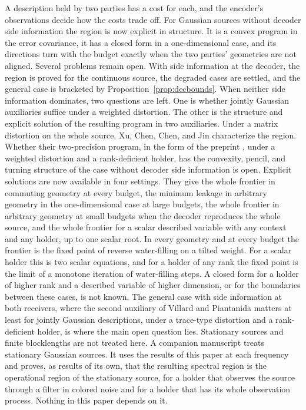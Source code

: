 \documentclass[11pt,onecolumn]{IEEEtran}
\begin{document}
A description held by two parties has a cost for each, and the
encoder's observations decide how the costs trade off. For Gaussian
sources without decoder side information the region is now explicit in
structure. It is a convex program in the error covariance, it has a closed form in a
one-dimensional case, and its directions turn with the budget exactly
when the two parties' geometries are not aligned. Several problems remain
open. With side information at the decoder, the region is proved for
the continuous source, the degraded cases are settled, and the general
case is bracketed by Proposition~\ref{prop:decbounds}. When neither side
information dominates, two questions are left. One is whether jointly
Gaussian auxiliaries suffice under a weighted distortion. The other is
the structure and explicit solution of the resulting program in two
auxiliaries.
Under a matrix distortion on the whole source, Xu, Chen, Chen, and Jin
\cite{xu2024} characterize the region. Whether their two-precision
program, in the form of the preprint \cite{xuchen2021}, under a
weighted distortion and a rank-deficient holder, has the convexity,
pencil, and turning structure of the case without decoder side
information is open. Explicit solutions are now available in four
settings. They give the whole frontier in commuting geometry at every budget, the
minimum leakage in arbitrary geometry in the one-dimensional case at
large budgets, the whole frontier in arbitrary geometry at small
budgets when the decoder reproduces the whole source, and the whole
frontier for a scalar described variable with any context and any
holder, up to one scalar root. In every geometry and at every budget
the frontier is the fixed point of reverse water-filling on a tilted
weight. For a scalar holder this is two scalar equations, and for a
holder of any rank the fixed point is the limit of a monotone iteration
of water-filling steps. A closed form for a holder of higher rank and a
described variable of higher dimension, or for the boundaries between these cases,
is not known. The general case with side information at both receivers,
where the second auxiliary of Villard and Piantanida matters at least
for jointly Gaussian descriptions, under
a trace-type distortion and a rank-deficient holder, is where the main
open question lies. Stationary
sources and finite blocklengths are not treated here. A companion
manuscript \cite{part2} treats stationary Gaussian sources. It uses the
results of this paper at each frequency and proves, as results of its
own, that the resulting spectral region is the operational region of
the stationary source, for a holder that observes the source through a
filter in colored noise and for a holder that has its whole observation
process. Nothing in this paper depends on it.
\end{document}
